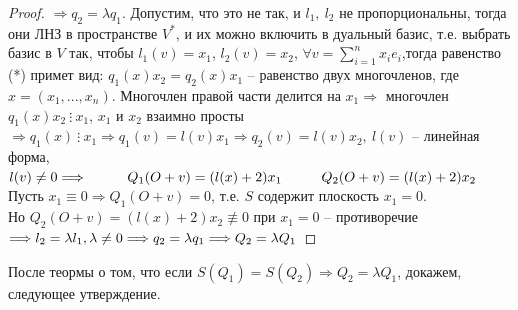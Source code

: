 \documentclass[a4paper, 12pt]{article}
\newcommand\tab[1][.5cm]{\hspace*{#1}}
\theoremstyle{definition}
\begin{document}
\begin{proof}
        $\Longrightarrow q_2 = \lambda q_1$. Допустим, что это 
        не так, и $l_1,\ l_2$ не пропорциональны, тогда
        они ЛНЗ в пространстве $V^*$, и их можно включить 
        в дуальный базис, т.е. выбрать базис в $V$  так, чтобы 
        $l_1(v) = x_1$, $l_2(v) = x_2$, $\forall v = 
        \sum\limits_{i=1}^{n} x_ie_i$,тогда равенство (*)
        примет вид: $q_1(x)x_2 = q_2(x)x_1$ -- равенство двух 
        многочленов, где $x = (x_1,...,x_n)$. Многочлен правой 
        части делится на $x_1 \Longrightarrow $ многочлен
        $q_1(x)x_2\ \vdots\ x_1$, $x_1$ и $x_2$ взаимно 
        просты $\Longrightarrow q_1(x)\ \vdots\ x_1 
        \Longrightarrow q_1(v) = l(v)x_1 \Longrightarrow 
        q_2(v) = l(v)x_2,\ l(v)$ -- линейная форма, $l(v) \neq 
        0 \Longrightarrow\\\tab[1cm]Q_1(O + v) = (l(x) + 2)x_1\\
        \tab[1cm]Q_2(O + v) = (l(x) + 2)x_2$\\
        Пусть $x_1 \equiv 0 \Longrightarrow Q_1(O + v) = 0$,
        т.е. $S$ содержит плоскость $x_1 = 0$.\\ Но $Q_2(O + v) 
        = (l(x) + 2)x_2 \not\equiv 0$ при $x_1 = 0$ -- 
        противоречие $\Longrightarrow l_2 = \lambda l_1,\\ 
        \lambda \neq 0 \Longrightarrow q_2 = \lambda q_1
        \Longrightarrow Q_2 = \lambda Q_1$ 

    \end{proof}
    После теормы о том, что если $S(Q_1) = S(Q_2) \Longrightarrow Q_2 = \lambda Q_1$, докажем, следующее утверждение. 
\end{document}
